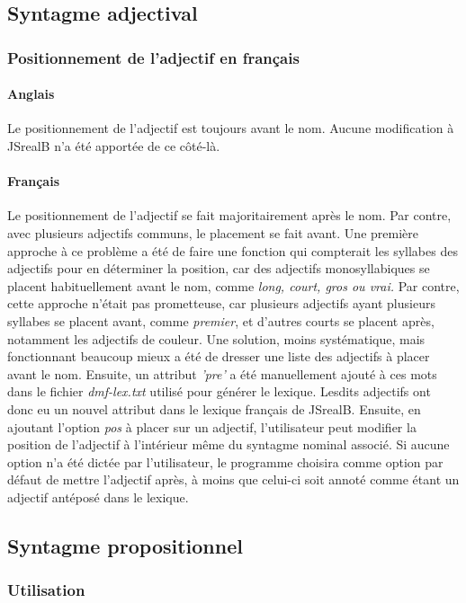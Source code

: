 \documentclass[11pt]{article} %
\begin{document}
\subsection{Syntagme adjectival}
\subsubsection{Positionnement de l'adjectif en français}
\paragraph{Anglais} Le positionnement de l'adjectif est toujours avant le nom. 
Aucune modification à JSrealB n'a été apportée de ce côté-là.
\paragraph{Français}
Le positionnement de l'adjectif se fait majoritairement
après le nom. Par contre, avec plusieurs adjectifs communs, le placement
se fait avant. Une première approche à ce problème a été de faire
une fonction qui compterait les syllabes des adjectifs pour en déterminer
la position, car des adjectifs monosyllabiques se placent habituellement
avant le nom, comme \emph{long, court, gros ou vrai.} Par contre,
cette approche n'était pas prometteuse, car plusieurs adjectifs ayant
plusieurs syllabes se placent avant, comme \emph{premier}, et d'autres
courts se placent après, notamment les adjectifs de couleur. Une solution,
moins systématique, mais fonctionnant beaucoup mieux a été de dresser
une liste des adjectifs à placer avant le nom. Ensuite, un attribut
\emph{'pre'} a été manuellement ajouté à ces mots dans le fichier
\emph{dmf-lex.txt }utilisé pour générer le lexique. Lesdits adjectifs
ont donc eu un nouvel attribut dans le lexique français de JSrealB.
Ensuite, en ajoutant l'option \emph{pos} à placer sur un adjectif,
l'utilisateur peut modifier la position de l'adjectif à l'intérieur
même du syntagme nominal associé. Si aucune option n'a été dictée
par l'utilisateur, le programme choisira comme option par défaut de
mettre l'adjectif après, à moins que celui-ci soit annoté comme étant
un adjectif antéposé dans le lexique. 


\subsection{Syntagme propositionnel}
\label{syntProp}

\subsubsection{Utilisation}
\end{document}
